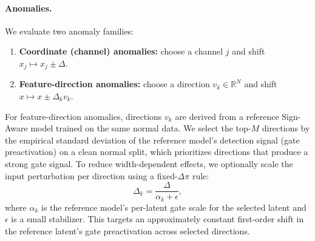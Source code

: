 \documentclass{article}
\begin{document}
\paragraph{Anomalies.}
We evaluate two anomaly families:
\begin{enumerate}
    \item \textbf{Coordinate (channel) anomalies:} choose a channel $j$ and shift $x_j \mapsto x_j \pm \Delta$.
    \item \textbf{Feature-direction anomalies:} choose a direction $v_k \in \mathbb{R}^N$ and shift $x \mapsto x \pm \Delta_k v_k$.
\end{enumerate}
For feature-direction anomalies, directions $v_k$ are derived from a reference Sign-Aware model trained on the same normal data. We select the top-$M$ directions by the empirical standard deviation of the reference model's detection signal (gate preactivation) on a clean normal split, which prioritizes directions that produce a strong gate signal. To reduce width-dependent effects, we optionally scale the input perturbation per direction using a fixed-$\Delta \pi$ rule:
\begin{equation}
    \Delta_k = \frac{\Delta}{\alpha_k + \epsilon},
\end{equation}
where $\alpha_k$ is the reference model's per-latent gate scale for the selected latent and $\epsilon$ is a small stabilizer. This targets an approximately constant first-order shift in the reference latent's gate preactivation across selected directions.
\end{document}
